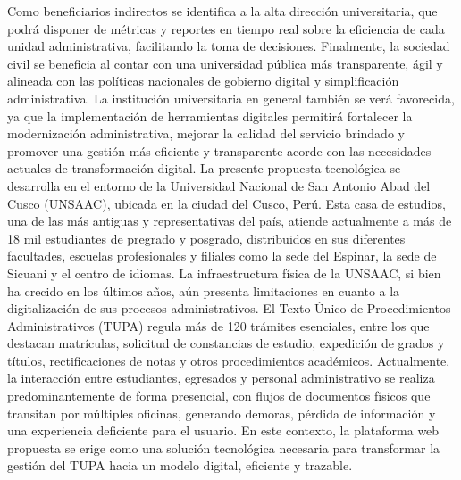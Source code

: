 Como beneficiarios indirectos se identifica a la alta dirección universitaria, que podrá disponer de métricas y 
reportes en tiempo real sobre la eficiencia de cada unidad administrativa, facilitando la toma de decisiones. 
Finalmente, la sociedad civil se beneficia al contar con una universidad pública más transparente, ágil y alineada 
con las políticas nacionales de gobierno digital y simplificación administrativa. La institución universitaria en 
general también se verá favorecida, ya que la implementación de herramientas digitales permitirá fortalecer la 
modernización administrativa, mejorar la calidad del servicio brindado y promover una gestión más eficiente y 
transparente acorde con las necesidades actuales de transformación digital.
La presente propuesta tecnológica se desarrolla en el entorno de la Universidad Nacional de San Antonio Abad del Cusco (UNSAAC), 
ubicada en la ciudad del Cusco, Perú. Esta casa de estudios, una de las más antiguas y representativas del país, atiende actualmente
a más de 18 mil estudiantes de pregrado y posgrado, distribuidos en sus diferentes facultades, escuelas profesionales y filiales como
la sede del Espinar, la sede de Sicuani y el centro de idiomas. La infraestructura física de la UNSAAC, si bien ha crecido en los últimos
años, aún presenta limitaciones en cuanto a la digitalización de sus procesos administrativos. El Texto Único de Procedimientos 
Administrativos (TUPA) regula más de 120 trámites esenciales, entre los que destacan matrículas, solicitud de constancias de estudio, 
expedición de grados y títulos, rectificaciones de notas y otros procedimientos académicos. Actualmente, la interacción entre estudiantes, 
egresados y personal administrativo se realiza predominantemente de forma presencial, con flujos de documentos físicos que transitan por 
múltiples oficinas, generando demoras, pérdida de información y una experiencia deficiente para el usuario. En este contexto, la plataforma 
web propuesta se erige como una solución tecnológica necesaria para transformar la gestión del TUPA hacia un modelo digital, eficiente y trazable.
\lipsum[1]

